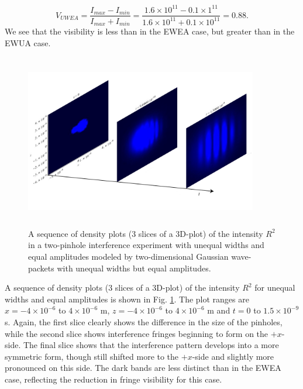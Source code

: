 \documentclass[12pt]{article}       %
\begin{document}
\[
V_{UWEA}=\frac{I_{max}-I_{min}}{I_{max}+I_{min}}=\frac{1.6\times 10^{11}-0.1\times 1^{11}}{1.6\times 10^{11}+0.1\times 10^{11}}=0.88.
\]
We see that the visibility is less than in the EWEA case, but greater than in the EWUA case.

\begin{figure}[h]
\unitlength=1in 
\hspace*{1.0in}\includegraphics[width=4in,height=3in]  {figure17.jpg} 
\caption{A sequence of density plots (3 slices of a 3D-plot) of the intensity $R^2$ in a two-pinhole interference experiment  with unequal widths and equal amplitudes  modeled by two-dimensional Gaussian wave-packets with unequal widths but equal amplitudes.\label{INT2DGDPUW}}
\end{figure}
A sequence of density plots (3 slices of a 3D-plot) of the intensity $R^2$ for unequal widths and equal amplitudes is shown in Fig. \ref{INT2DGDPUW}. The plot  ranges are $x=-4\times 10^{-6}$ to $4\times 10^{-6}$ m, $z=-4\times 10^{-6}$ to $4\times 10^{-6}$ m  and $t=0$ to $1.5\times 10^{-9}$ s. Again, the first slice clearly shows the difference in the  size of the pinholes, while the second slice  shows interference fringes beginning to  form on the $+x$-side. The final slice shows that the interference pattern develops into a more symmetric form, though still shifted more to the $+x$-side  and slightly more  pronounced on this side. The dark bands are less distinct than in the EWEA case, reflecting the reduction in fringe visibility for this case. 
\end{document}
